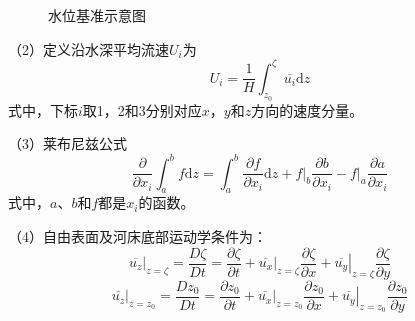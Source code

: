 \begin{figure}
  \begin{tikzpicture}
  \end{tikzpicture}
  \caption{水位基准示意图}
\end{figure}

（2）定义沿水深平均流速$U_i$为
\begin{equation}
  U_i
  =
  \frac{1}{H}
\int_{z_{0}}^{\zeta}\!\overline{u_{i}}\mathrm{d}z
\end{equation}
式中，下标$i$取1，2和3分别对应$x$，$y$和$z$方向的速度分量。

（3）莱布尼兹公式
\begin{equation}
  \frac{\partial}{\partial x_{i}}
  \int_{a}^{b}\!f\mathrm{d}z
  =
  \int_{a}^{b}\!
  \frac{\partial f}{\partial x_{i}}\mathrm{d}z
  +
  \left.f\right|_{b}\frac{\partial b}{\partial x_{i}}
  -
  \left.f\right|_{a}\frac{\partial a}{\partial x_{i}}
    \label{EqCGeLeibnizLaw}
\end{equation}
式中，$a$、$b$和$f$都是$x_{i}$的函数。

（4）自由表面及河床底部运动学条件为：
\begin{equation}
  \left.\overline{u_{z}}\right|_{z=\zeta}
    =
    \frac{D\zeta}{Dt}
    =
    \frac{\partial\zeta}{\partial t}
    +
    \left.\overline{u_{x}}\right|_{z=\zeta}\frac{\partial\zeta}{\partial x}
      +
    \left.\overline{u_{y}}\right|_{z=\zeta}\frac{\partial\zeta}{\partial y}
    \label{EqCGeSMC}
\end{equation}
\begin{equation}
  \left.\overline{u_{z}}\right|_{z=z_{0}}
    =
    \frac{Dz_{0}}{Dt}
    =
    \frac{\partial z_{0}}{\partial t}
    +
    \left.\overline{u_{x}}\right|_{z=z_{0}}\frac{\partial z_{0}}{\partial x}
      +
    \left.\overline{u_{y}}\right|_{z=z_{0}}\frac{\partial z_{0}}{\partial y}
    \label{EqCGeBMC}
\end{equation}

